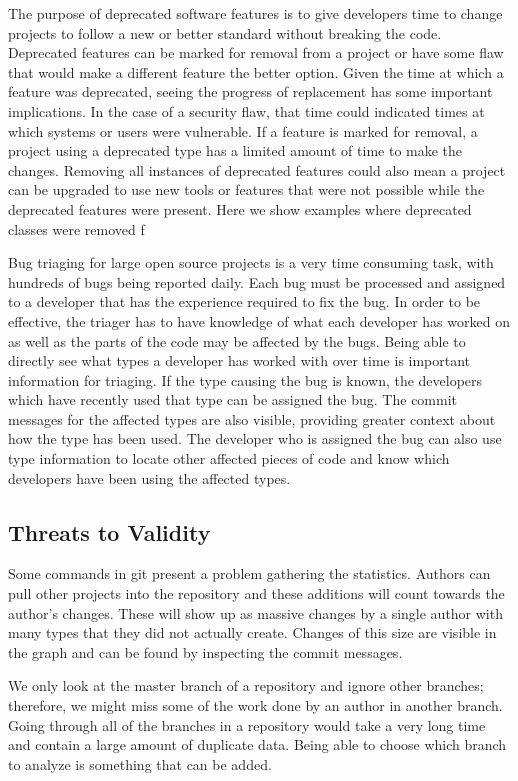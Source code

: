 \documentclass[conference]{IEEEtran}
\begin{document}
The purpose of deprecated software features is to give developers time to change projects to follow a new or better standard without breaking the code. Deprecated features can be marked for removal from a project or have some flaw that would make a different feature the better option. Given the time at which a feature was deprecated, seeing the progress of replacement has some important implications. In the case of a security flaw, that time could indicated times at which systems or users were vulnerable. If a feature is marked for removal, a project using a deprecated type has a limited amount of time to make the changes. Removing all instances of deprecated features could also mean a project can be upgraded to use new tools or features that were not possible while the deprecated features were present.  Here we show examples where deprecated classes were removed f

Bug triaging for large open source projects is a very time consuming task, with hundreds  of bugs being reported daily. Each bug must be processed and assigned to a developer that has the experience required to fix the bug. In order to be effective, the triager has to have knowledge of what each developer has worked on as well as the parts of the code may be affected by the bugs. Being able to directly see what types a developer has worked with over time is important information for triaging. If the type causing the bug is known, the developers which have recently used that type can be assigned the bug. The commit messages for the affected types are also visible, providing greater context about how the type has been used. The developer who is assigned the bug can also use type information to locate other affected pieces of code and know which developers have been using the affected types.

\subsection{Threats to Validity}

Some commands in git present a problem gathering the statistics. Authors can pull other projects into the repository and these additions will count towards the author's changes. These will show up as massive changes by a single author with many types that they did not actually create. Changes of this size are visible in the graph and can be found by inspecting the commit messages.

We only look at the master branch of a repository and ignore other branches; therefore, we might miss some of the work done by an author in another branch. Going through all of the branches in a repository would take a very long time and contain a large amount of duplicate data. Being able to choose which branch to analyze is something that can be added.
\end{document}
